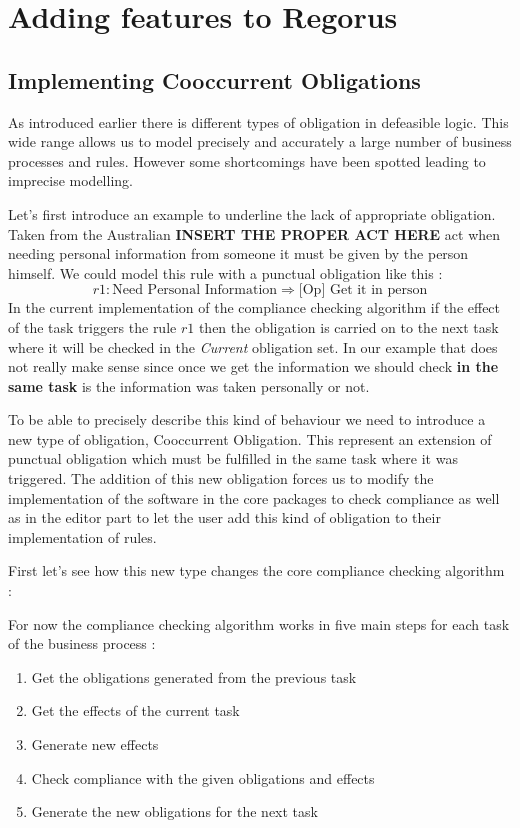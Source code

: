 \documentclass[10pt]{report}
\begin{document}
\newpage
\section{Adding features to Regorus}
\subsection{Implementing Cooccurrent Obligations}
As introduced earlier there is different types of obligation in defeasible logic. This wide range allows us to model precisely and accurately a large number of business processes and rules. However some shortcomings have been spotted leading to imprecise modelling.

Let's first introduce an example to underline the lack of appropriate obligation. Taken from the Australian \textbf{INSERT THE PROPER ACT HERE} act when needing personal information from someone it must be given by the person himself. We could model this rule with a punctual obligation like this :
\begin{equation}
r1 : \text{Need Personal Information} \Rightarrow \text{[Op] Get it in person}
\end{equation}
In the current implementation of the compliance checking algorithm if the effect of the task triggers the rule $r1$ then the obligation is carried on to the next task where it will be checked in the \textit{Current} obligation set. In our example that does not really make sense since once we get the information we should check \textbf{in the same task} is the information was taken personally or not.

To be able to precisely describe this kind of behaviour we need to introduce a new type of obligation, Cooccurrent Obligation. This represent an extension of punctual obligation which must be fulfilled in the same task where it was triggered. The addition of this new obligation forces us to modify the implementation of the software in the core packages to check compliance as well as in the editor part to let the user add this kind of obligation to their implementation of rules.

First let's see how this new type changes the core compliance checking algorithm :

For now the compliance checking algorithm works in five main steps for each task of the business process :
\begin{enumerate}
\item Get the obligations generated from the previous task
\item Get the effects of the current task
\item Generate new effects
\item Check compliance with the given obligations and effects
\item Generate the new obligations for the next task
\end{enumerate}
\end{document}
